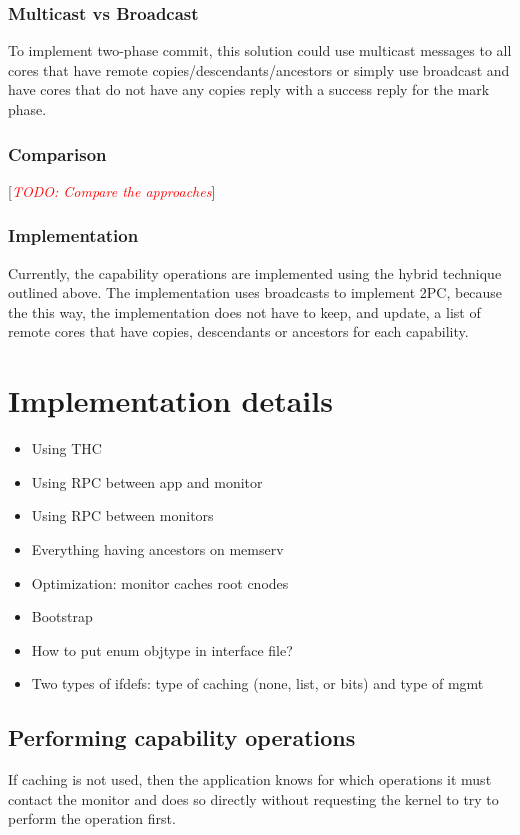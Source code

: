 \documentclass[a4paper,twoside]{report} %
\newcommand{\note}[1]{[\textcolor{red}{\textit{#1}}]}
\begin{document}
\subsection{Multicast vs Broadcast}
To implement two-phase commit, this solution could use multicast messages to
all cores that have remote copies/descendants/ancestors or simply use
broadcast and have cores that do not have any copies reply with a success
reply for the mark phase.

\subsection{Comparison}
\note{TODO: Compare the approaches}

\subsection{Implementation}

Currently, the capability operations are implemented using the hybrid
technique outlined above.
The implementation uses broadcasts to implement 2PC, because the this way, the
implementation does not have to keep, and update, a list of remote cores that
have copies, descendants or ancestors for each capability.


\chapter{Implementation details}\label{chap:implementation}

\begin{itemize}
\item Using THC
\item Using RPC between app and monitor
\item Using RPC between monitors
\item Everything having ancestors on memserv
\item Optimization: monitor caches root cnodes
\item Bootstrap
\item How to put enum objtype in interface file?
\item Two types of ifdefs: type of caching (none, list, or bits) and
  type of mgmt
\end{itemize}

\section{Performing capability operations}
If caching is not used, then the application knows for which
operations it must contact the monitor and does so directly without
requesting the kernel to try to perform the operation first.
\end{document}
